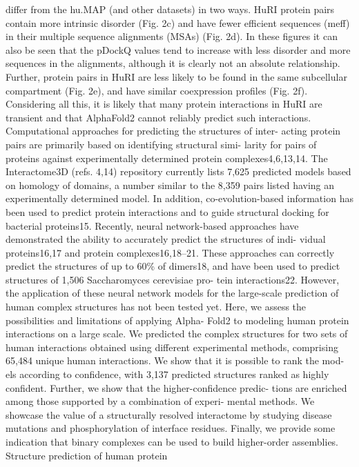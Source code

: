 differ from the hu.MAP (and other datasets) in two ways. HuRI protein
pairs contain more intrinsic disorder (Fig. 2c) and have fewer efficient
sequences (meff) in their multiple sequence alignments (MSAs) (Fig. 2d).
In these figures it can also be seen that the pDockQ values tend to
increase with less disorder and more sequences in the alignments,
although it is clearly not an absolute relationship. Further, protein pairs
in HuRI are less likely to be found in the same subcellular compartment
(Fig. 2e), and have similar coexpression profiles (Fig. 2f). Considering
all this, it is likely that many protein interactions in HuRI are transient
and that AlphaFold2 cannot reliably predict such interactions.
Computational approaches for predicting the structures of inter-
acting protein pairs are primarily based on identifying structural simi-
larity for pairs of proteins against experimentally determined protein
complexes4,6,13,14. The Interactome3D (refs. 4,14) repository currently
lists 7,625 predicted models based on homology of domains, a number
similar to the 8,359 pairs listed having an experimentally determined
model. In addition, co-evolution-based information has been used
to predict protein interactions and to guide structural docking for
bacterial proteins15. Recently, neural network-based approaches have
demonstrated the ability to accurately predict the structures of indi-
vidual proteins16,17 and protein complexes16,18–21. These approaches
can correctly predict the structures of up to 60\% of dimers18, and have
been used to predict structures of 1,506 Saccharomyces cerevisiae pro-
tein interactions22. However, the application of these neural network
models for the large-scale prediction of human complex structures
has not been tested yet.
Here, we assess the possibilities and limitations of applying Alpha-
Fold2 to modeling human protein interactions on a large scale. We
predicted the complex structures for two sets of human interactions
obtained using different experimental methods, comprising 65,484
unique human interactions. We show that it is possible to rank the mod-
els according to confidence, with 3,137 predicted structures ranked as
highly confident. Further, we show that the higher-confidence predic-
tions are enriched among those supported by a combination of experi-
mental methods. We showcase the value of a structurally resolved
interactome by studying disease mutations and phosphorylation of
interface residues. Finally, we provide some indication that binary
complexes can be used to build higher-order assemblies.
Structure prediction of human protein
